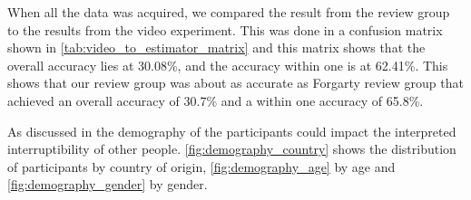 \documentclass{sigchi}
\begin{document}
When all the data was acquired, we compared the result from the review group to the results from the video experiment.
This was done in a confusion matrix shown in \autoref{tab:video_to_estimator_matrix} and this matrix shows that the overall accuracy lies at 30.08\%, and the accuracy within one is at 62.41\%.
This shows that our review group was about as accurate as Forgarty review group \cite{fogarty2005predicting} that achieved an overall accuracy of 30.7\% and a within one accuracy of 65.8\%.

As discussed in  the demography of the participants could impact the interpreted interruptibility of other people.
\autoref{fig:demography_country} shows the distribution of participants by country of origin, \autoref{fig:demography_age} by age and \autoref{fig:demography_gender} by gender.
\end{document}

